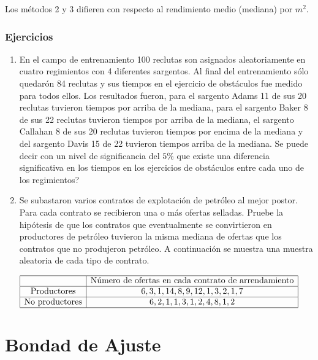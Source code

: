 \documentclass[
  a4paper,
  oneside,
  openany]{book}
\begin{document}
Los métodos 2 y 3 difieren con respecto al rendimiento medio (mediana) por \(m^2\).

\hypertarget{ejercicios-10}{%
\section{Ejercicios}\label{ejercicios-10}}

\begin{enumerate}
\def\labelenumi{\arabic{enumi}.}
\item
  En el campo de entrenamiento 100 reclutas son asignados aleatoriamente en cuatro regimientos con 4 diferentes sargentos. Al final del entrenamiento sólo quedarón 84 reclutas y sus tiempos en el ejercicio de obstáculos fue medido para todos ellos. Los resultados fueron, para el sargento Adams 11 de sus 20 reclutas tuvieron tiempos por arriba de la mediana, para el sargento Baker 8 de sus 22 reclutas tuvieron tiempos por arriba de la mediana, el sargento Callahan 8 de sus 20 reclutas tuvieron tiempos por encima de la mediana y del sargento Davis 15 de 22 tuvieron tiempos arriba de la mediana. Se puede decir con un nivel de significancia del \(5\%\) que existe una diferencia significativa en los tiempos en los ejercicios de obstáculos entre cada uno de los regimientos?
\item
  Se subastaron varios contratos de explotación de petróleo al mejor postor. Para cada contrato se recibieron una o más ofertas selladas. Pruebe la hipótesis de que los contratos que eventualmente se convirtieron en productores de petróleo tuvieron la misma mediana de ofertas que los contratos que no produjeron petróleo. A continuación se muestra una muestra aleatoria de cada tipo de contrato.
\end{enumerate}

\[
\begin{array}{|c | c |}
\hline
&\mbox{Número de ofertas en cada contrato de arrendamiento} \\
   \hline
\mbox{Productores}& 6, 3, 1, 14, 8, 9, 12, 1, 3, 2, 1, 7  \\
  \hline
\mbox{No  productores}&6, 2, 1, 1, 3, 1, 2, 4, 8, 1, 2\\
    \hline
\end{array}
\]

\hypertarget{part-bondad-de-ajuste}{%
\part{Bondad de Ajuste}\label{part-bondad-de-ajuste}}
\end{document}
